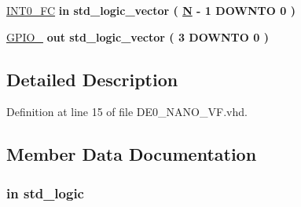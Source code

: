 \begin{DoxyCompactItemize}
\item 
\hyperlink{class_d_e0___n_a_n_o___v_f_a2da3143aa39453a927d622998a1d936b}{I\+N\+T0\+\_\+\+F\+C}  {\bfseries {\bfseries \textcolor{keywordflow}{in}\textcolor{vhdlchar}{ }}} {\bfseries \textcolor{comment}{std\+\_\+logic\+\_\+vector}\textcolor{vhdlchar}{ }\textcolor{vhdlchar}{(}\textcolor{vhdlchar}{ }\textcolor{vhdlchar}{ }\textcolor{vhdlchar}{ }\textcolor{vhdlchar}{ }{\bfseries \hyperlink{class_d_e0___n_a_n_o___v_f_af855138be951f4c562436dfd59f85b54}{N}} \textcolor{vhdlchar}{-\/}\textcolor{vhdlchar}{ } \textcolor{vhdldigit}{1} \textcolor{vhdlchar}{ }\textcolor{keywordflow}{D\+O\+W\+N\+T\+O}\textcolor{vhdlchar}{ }\textcolor{vhdlchar}{ } \textcolor{vhdldigit}{0} \textcolor{vhdlchar}{ }\textcolor{vhdlchar}{)}\textcolor{vhdlchar}{ }} 
\item 
\hyperlink{class_d_e0___n_a_n_o___v_f_a01eff012417d9c479e11ca1e08d0fdb5}{G\+P\+I\+O\+\_}  {\bfseries {\bfseries \textcolor{keywordflow}{out}\textcolor{vhdlchar}{ }}} {\bfseries \textcolor{comment}{std\+\_\+logic\+\_\+vector}\textcolor{vhdlchar}{ }\textcolor{vhdlchar}{(}\textcolor{vhdlchar}{ }\textcolor{vhdlchar}{ } \textcolor{vhdldigit}{3} \textcolor{vhdlchar}{ }\textcolor{keywordflow}{D\+O\+W\+N\+T\+O}\textcolor{vhdlchar}{ }\textcolor{vhdlchar}{ } \textcolor{vhdldigit}{0} \textcolor{vhdlchar}{ }\textcolor{vhdlchar}{)}\textcolor{vhdlchar}{ }} 
\end{DoxyCompactItemize}


\subsection{Detailed Description}


Definition at line 15 of file D\+E0\+\_\+\+N\+A\+N\+O\+\_\+\+V\+F.\+vhd.



\subsection{Member Data Documentation}
\hypertarget{class_d_e0___n_a_n_o___v_f_a4b5e1e3eba67b2e61c77c9a719d8518c}{}
\subsubsection[{C\+L\+O\+C\+K\+\_\+50}]{ {\bfseries \textcolor{keywordflow}{in}\textcolor{vhdlchar}{ }} {\bfseries \textcolor{comment}{std\+\_\+logic}\textcolor{vhdlchar}{ }} \hspace{0.3cm}{\ttfamily [Port]}}\label{class_d_e0___n_a_n_o___v_f_a4b5e1e3eba67b2e61c77c9a719d8518c}


